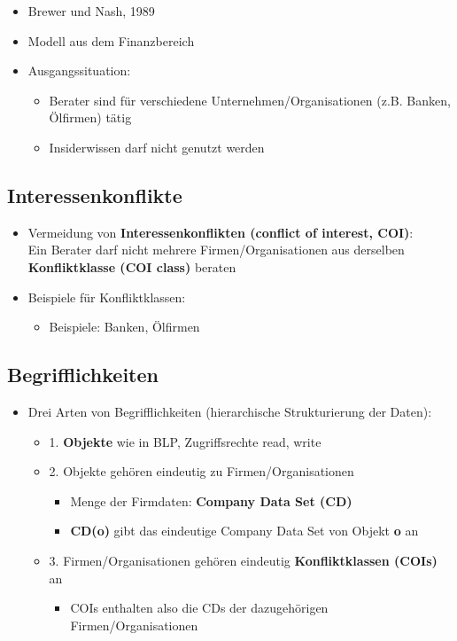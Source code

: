 \documentclass[openany]{book}
\begin{document}
\begin{itemize}
\item Brewer und Nash, 1989
\item Modell aus dem Finanzbereich
\item Ausgangssituation:
\begin{itemize}
\item Berater sind für verschiedene Unternehmen/Organisationen (z.B. Banken, Ölfirmen) tätig
\item Insiderwissen darf nicht genutzt werden
\end{itemize}
\end{itemize}

\subsection{Interessenkonflikte}

\begin{itemize}
\item Vermeidung von \textbf{Interessenkonflikten (conflict of interest, COI)}: \\ Ein Berater darf nicht mehrere Firmen/Organisationen aus derselben \textbf{Konfliktklasse (COI class)} beraten
\item Beispiele für Konfliktklassen:
\begin{itemize}
\item Beispiele: Banken, Ölfirmen
\end{itemize}
\end{itemize}

\subsection{Begrifflichkeiten}

\begin{itemize}
\item Drei Arten von Begrifflichkeiten (hierarchische Strukturierung der Daten):
\begin{itemize}
\item 1. \textbf{Objekte} wie in BLP, Zugriffsrechte read, write
\item 2. Objekte gehören eindeutig zu Firmen/Organisationen
\begin{itemize}
\item Menge der Firmdaten: \textbf{Company Data Set (CD)}
\item \textbf{CD(o)} gibt das eindeutige Company Data Set von Objekt \textbf{o} an
\end{itemize}
\item 3. Firmen/Organisationen gehören eindeutig \textbf{Konfliktklassen (COIs)} an
\begin{itemize}
\item COIs enthalten also die CDs der dazugehörigen Firmen/Organisationen
\end{itemize}
\end{itemize}
\end{itemize}
\end{document}
